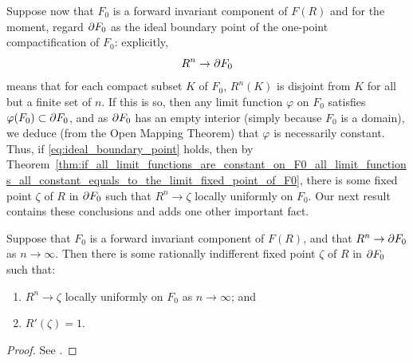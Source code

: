 Suppose now that $F_0$ is a forward invariant component of $F(R)$ and for the
moment, regard $\partial {F_0}$ as the ideal boundary point of the one-point
compactification of $F_0$: explicitly,
\begin{equation}
    \label{eq:ideal_boundary_point}
    R^n \to \partial {F_0}
\end{equation}
means that for each compact subset $K$ of $F_0$, $R^n(K)$ is disjoint from $K$
for all but a finite set of $n$. If this is so, then any limit function
$\varphi$ on $F_0$ satisfies $\varphi(F_0) \subset \partial {F_0}$, and as
$\partial {F_0}$ has an empty interior (simply because $F_0$ is a domain), we
deduce (from the Open Mapping Theorem) that $\varphi$ is necessarily constant.
Thus, if \eqref{eq:ideal_boundary_point} holds, then by
Theorem~\ref{thm:if_all_limit_functions_are_constant_on_F0_all_limit_functions_all_constant_equals_to_the_limit_fixed_point_of_F0},
there is some fixed point $\zeta$ of $R$ in $\partial {F_0}$ such that $R^n \to
\zeta$ locally uniformly on $F_0$. Our next result contains these conclusions
and adds one other important fact.

\begin{theorem}
    \label{thm:if_Rn_converges_on_boundary_F0_then_F0_is_a_parabolic_component}
    Suppose that $F_0$ is a forward invariant component of $F(R)$, and that $R^n
    \to \partial {F_0}$ as $n \to \infty$. Then there is some rationally
    indifferent fixed point $\zeta$ of $R$ in $\partial {F_0}$ such that:
    \begin{enumerate}[label=(\alph*)]
        \item $R^n \to \zeta$ locally uniformly on $F_0$ as $n \to \infty$; and
        \item $R'(\zeta) = 1$.
    \end{enumerate}
\end{theorem}
\begin{proof}
    See \cite[165-166]{Beardon1991}.
\end{proof}

